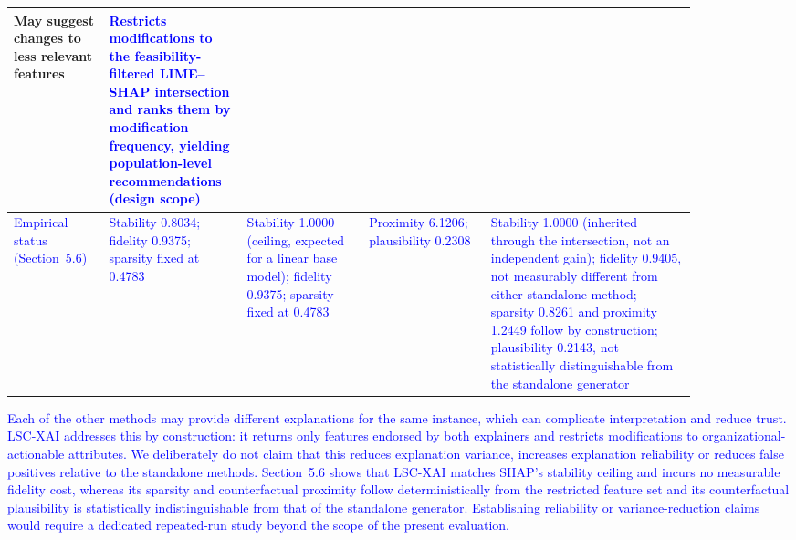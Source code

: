 \documentclass[a4paper,fleqn]{cas-sc}
\begin{document}
\begin{table}[width=1\linewidth,cols=5,pos=H]
\begin{tabular*}{\tblwidth}{p{0.12\linewidth}p{0.16\linewidth}p{0.16\linewidth}p{0.16\linewidth}p{0.27\linewidth}}
May suggest changes to less relevant features &  \textcolor{blue}{Restricts modifications to the feasibility-filtered LIME--SHAP intersection and ranks them by modification frequency, yielding population-level recommendations (design scope)}
\\\hline
\textcolor{blue}{Empirical status (Section~5.6)} & \textcolor{blue}{Stability 0.8034; fidelity 0.9375; sparsity fixed at 0.4783} & \textcolor{blue}{Stability 1.0000 (ceiling, expected for a linear base model); fidelity 0.9375; sparsity fixed at 0.4783} & \textcolor{blue}{Proximity 6.1206; plausibility 0.2308} & \textcolor{blue}{Stability 1.0000 (inherited through the intersection, not an independent gain); fidelity 0.9405, not measurably different from either standalone method; sparsity 0.8261 and proximity 1.2449 follow by construction; plausibility 0.2143, not statistically distinguishable from the standalone generator} \\\hline
\end{tabular*}
\end{table}
\textcolor{blue}{Each of the other methods may provide different explanations for the same instance, which can complicate interpretation and reduce trust. LSC-XAI addresses this by construction: it returns only features endorsed by both explainers and restricts modifications to organizational-actionable attributes. We deliberately do not claim that this reduces explanation variance, increases explanation reliability or reduces false positives relative to the standalone methods. Section~5.6 shows that LSC-XAI matches SHAP's stability ceiling and incurs no measurable fidelity cost, whereas its sparsity and counterfactual proximity follow deterministically from the restricted feature set and its counterfactual plausibility is statistically indistinguishable from that of the standalone generator. Establishing reliability or variance-reduction claims would require a dedicated repeated-run study beyond the scope of the present evaluation.}
\end{document}
